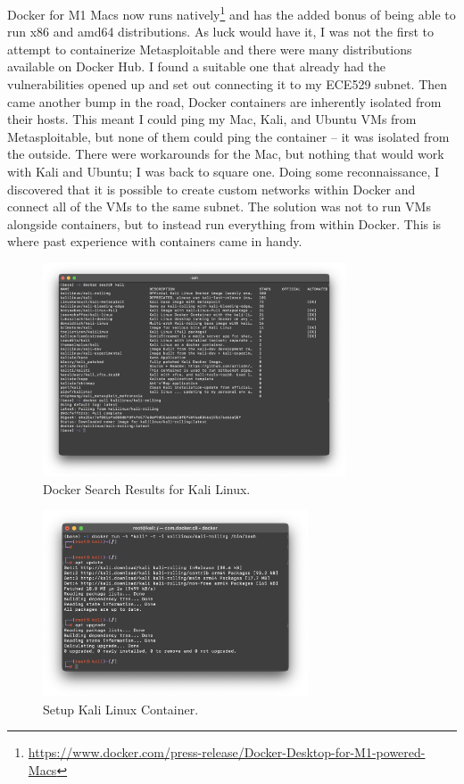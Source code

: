 \documentclass[12pt]{article}
\begin{document}
Docker for M1 Macs now runs natively\footnote{\href{https://www.docker.com/press-release/Docker-Desktop-for-M1-powered-Macs}{https://www.docker.com/press-release/Docker-Desktop-for-M1-powered-Macs}} and has the added bonus of being able to run x86 and amd64 distributions. As luck would have it, I was not the first to attempt to containerize Metasploitable and there were many distributions available on Docker Hub. I found a suitable one that already had the vulnerabilities opened up and set out connecting it to my ECE529 subnet. Then came another bump in the road, Docker containers are inherently isolated from their hosts. This meant I could ping my Mac, Kali, and Ubuntu VMs from Metasploitable, but none of them could ping the container -- it was isolated from the outside. There were workarounds for the Mac, but nothing that would work with Kali and Ubuntu; I was back to square one. Doing some reconnaissance, I discovered that it is possible to create custom networks within Docker and connect all of the VMs to the same subnet. The solution was not to run VMs alongside containers, but to instead run everything from within Docker. This is where past experience with containers came in handy.

\begin{figure}[!ht]
    \centering
    \includegraphics[width=0.8\textwidth]{figure02.png}\vspace{-1em}
    \caption{Docker Search Results for Kali Linux.}
    \label{fig:DockerSearch}
\end{figure}

\begin{figure}[!ht]
    \centering
    \includegraphics[width=0.7\textwidth]{figure03.png}\vspace{-1em}
    \caption{Setup Kali Linux Container.}
    \label{fig:RunKali}
\end{figure}
\end{document}
